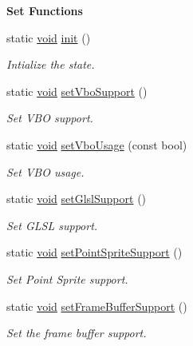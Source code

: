 \begin{Indent}{\bf Set Functions}\par
\begin{DoxyCompactItemize}
\item 
static \hyperlink{group___u_a_v_objects_plugin_ga444cf2ff3f0ecbe028adce838d373f5c}{void} \hyperlink{class_g_l_c___state_af303bf20ebd03464a20b5492766edc24}{init} ()
\begin{DoxyCompactList}\small\item\em Intialize the state. \end{DoxyCompactList}\item 
static \hyperlink{group___u_a_v_objects_plugin_ga444cf2ff3f0ecbe028adce838d373f5c}{void} \hyperlink{class_g_l_c___state_a9e658a47ca256175cfc5fe0b7c9293ef}{set\-Vbo\-Support} ()
\begin{DoxyCompactList}\small\item\em Set V\-B\-O support. \end{DoxyCompactList}\item 
static \hyperlink{group___u_a_v_objects_plugin_ga444cf2ff3f0ecbe028adce838d373f5c}{void} \hyperlink{class_g_l_c___state_a86fa8508ccdc01931965416b325f831a}{set\-Vbo\-Usage} (const bool)
\begin{DoxyCompactList}\small\item\em Set V\-B\-O usage. \end{DoxyCompactList}\item 
static \hyperlink{group___u_a_v_objects_plugin_ga444cf2ff3f0ecbe028adce838d373f5c}{void} \hyperlink{class_g_l_c___state_a0a8f8a0cb3536364f6277f8e97c0382a}{set\-Glsl\-Support} ()
\begin{DoxyCompactList}\small\item\em Set G\-L\-S\-L support. \end{DoxyCompactList}\item 
static \hyperlink{group___u_a_v_objects_plugin_ga444cf2ff3f0ecbe028adce838d373f5c}{void} \hyperlink{class_g_l_c___state_aaf26ebe5aa6ad8a40e6e59fb95bb8288}{set\-Point\-Sprite\-Support} ()
\begin{DoxyCompactList}\small\item\em Set Point Sprite support. \end{DoxyCompactList}\item 
static \hyperlink{group___u_a_v_objects_plugin_ga444cf2ff3f0ecbe028adce838d373f5c}{void} \hyperlink{class_g_l_c___state_a6c171a8c104aceaf2505cde09104c112}{set\-Frame\-Buffer\-Support} ()
\begin{DoxyCompactList}\small\item\em Set the frame buffer support. \end{DoxyCompactList}\item 

\end{DoxyCompactItemize}
\end{Indent}

